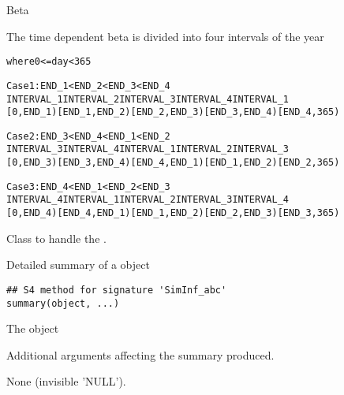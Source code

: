 \documentclass[letterpaper]{book}
\begin{document}
%
\begin{Section}{Beta}

The time dependent beta is divided into four intervals of the year
\begin{alltt}
where 0 <= day < 365

Case 1: END_1 < END_2 < END_3 < END_4
INTERVAL_1 INTERVAL_2     INTERVAL_3     INTERVAL_4     INTERVAL_1
[0, END_1) [END_1, END_2) [END_2, END_3) [END_3, END_4) [END_4, 365)

Case 2: END_3 < END_4 < END_1 < END_2
INTERVAL_3 INTERVAL_4     INTERVAL_1     INTERVAL_2     INTERVAL_3
[0, END_3) [END_3, END_4) [END_4, END_1) [END_1, END_2) [END_2, 365)

Case 3: END_4 < END_1 < END_2 < END_3
INTERVAL_4 INTERVAL_1     INTERVAL_2     INTERVAL_3     INTERVAL_4
[0, END_4) [END_4, END_1) [END_1, END_2) [END_2, END_3) [END_3, 365)
\end{alltt}

\end{Section}
%
\begin{Description}
Class to handle the  .
\end{Description}
%
\begin{Description}
Detailed summary of a  object
\end{Description}
%
\begin{Usage}
\begin{verbatim}
## S4 method for signature 'SimInf_abc'
summary(object, ...)
\end{verbatim}
\end{Usage}
%
\begin{Arguments}
\begin{ldescription}
\item[\code{object}] The  object

\item[\code{...}] Additional arguments affecting the summary produced.
\end{ldescription}
\end{Arguments}
%
\begin{Value}
None (invisible 'NULL').
\end{Value}
\end{document}

